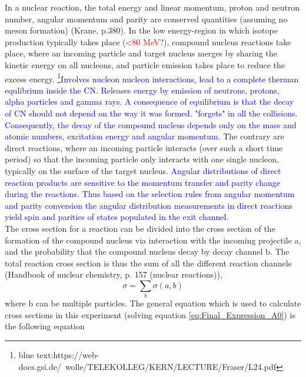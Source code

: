 In a nuclear reaction, the total energy and linear momentum, proton and neutron number, angular momentum and parity are conserved quantities (assuming no meson formation) (Krane, p.380). In the low energy-region in which isotope production typically takes place (\textcolor{red}{<80 MeV}?), compound nucleus reactions take place, where an incoming particle and target nucleus merges by sharing the kinetic energy on all nucleons, and particle emission takes place to reduce the excess energy. \textcolor{blue}{\footnote{blue text:https://web-docs.gsi.de/~wolle/TELEKOLLEG/KERN/LECTURE/Fraser/L24.pdf }Involves nucleon nucleon interactions, lead to a complete therman equlibrium inside the CN. Releases energy by emission of neutrons, protons, alpha particles and gamma rays. A consequence of equilibrium is that the decay of CN should not depend on the way it was formed. "forgets" in all the collisions. Consequently, the decay of the compound nucleus depends only on the mass and atomic numbers, excitation energy and angular momentum.} The contrary are direct reactions, where an incoming particle interacts (over such a short time period) so that the incoming particle only interacts with one single nucleon, typically on the surface of the target nucleus. \textcolor{blue}{Angular distributions of direct reaction products are sensitive to the momentum transfer and parity change during the reactions. Thus based on the selection rules from angular momentum and parity conversion the angular distribution measurements in direct reactions yield spin and parities of states populated in the exit channel}.  \\


\noindent 
The cross section for a reaction can be divided into the cross section of the formation of the compound nucleus via interaction with the incoming projectile a, and the probability that the compound nucleus decay by decay channel b. The total reaction cross section is thus the sum of all the different reaction channels (Handbook of nuclear chemistry, p. 157 (nuclear reactions)), 
\begin{equation}
    \sigma = \sum_b \sigma(a,b)
\end{equation}
where b can be multiple particles. The general equation which is used to calculate cross sections in this experiment (solving equation \ref{eq:Final_Expression_A0}) is the following equation 

